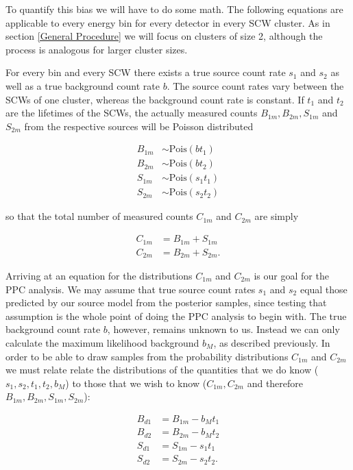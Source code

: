 \documentclass{report}
\begin{document}
To quantify this bias we will have to do some math. The following equations are applicable to every energy bin for every detector in every SCW cluster. As in section \ref{General Procedure} we will focus on clusters of size 2, although the process is analogous for larger cluster sizes.

For every bin and every SCW there exists a true source count rate $s_1$ and $s_2$ as well as a true background count rate $b$. The source count rates vary between the SCWs of one cluster, whereas the background count rate is constant. If $t_1$ and $t_2$ are the lifetimes of the SCWs, the actually measured counts $B_{1m}, B_{2m}, S_{1m}$ and $S_{2m}$ from the respective sources will be Poisson distributed

\begin{align} \label{eq measured counts}
    B_{1m} &\sim \text{Pois}(bt_1) \\
    B_{2m} &\sim \text{Pois}(bt_2) \\
    S_{1m} &\sim \text{Pois}(s_1t_1) \\
    S_{2m} &\sim \text{Pois}(s_2t_2)
\end{align}

so that the total number of measured counts $C_{1m}$ and $C_{2m}$ are simply

\begin{align} \label{eq tot counts ppc}
    C_{1m} &= B_{1m} + S_{1m} \\
    C_{2m} &= B_{2m} + S_{2m}.
\end{align}

Arriving at an equation for the distributions $C_{1m}$ and $C_{2m}$ is our goal for the PPC analysis. We may assume that true source count rates $s_1$ and $s_2$ equal those predicted by our source model from the posterior samples, since testing that assumption is the whole point of doing the PPC analysis to begin with. The true background count rate $b$, however, remains unknown to us. Instead we can only calculate the maximum likelihood background $b_M$, as described previously. In order to be able to draw samples from the probability distributions $C_{1m}$ and $C_{2m}$ we must relate relate the distributions of the quantities that we do know ($s_1, s_2, t_1, t_2, b_M$) to those that we wish to know ($C_{1m}, C_{2m}$ and therefore $B_{1m}, B_{2m}, S_{1m}, S_{2m}$):

\begin{align} \label{eq ppc dif}
    B_{d1} &= B_{1m} - b_Mt_1 \\
    B_{d2} &= B_{2m} - b_Mt_2 \\
    S_{d1} &= S_{1m} - s_1t_1 \\
    S_{d2} &= S_{2m} - s_2t_2.
\end{align}
\end{document}
